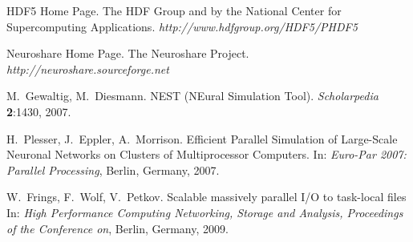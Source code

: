 \documentclass[]{YIC2015}
\begin{document}
\begin{thebibliography}{99}
HDF5 Home Page. The HDF Group and by the National Center for Supercomputing Applications. \textit{http://www.hdfgroup.org/HDF5/PHDF5}

Neuroshare Home Page. The Neuroshare Project. \textit{http://neuroshare.sourceforge.net}

M.~Gewaltig, M.~Diesmann. NEST (NEural Simulation Tool). \textit{Scholarpedia} %
\textbf{2}:1430, 2007.

H.~Plesser, J.~Eppler, A.~Morrison. Efficient Parallel Simulation of Large-Scale
                  Neuronal Networks on Clusters of Multiprocessor
                  Computers. In: \textit{Euro-Par 2007: Parallel Processing}, Berlin, Germany, 2007.

W.~Frings, F.~Wolf, V.~Petkov. Scalable massively parallel I/O to task-local files
 In: \textit{High Performance Computing Networking, Storage and Analysis, Proceedings of the Conference on}, Berlin, Germany, 2009.


\end{thebibliography}

\end{document}
